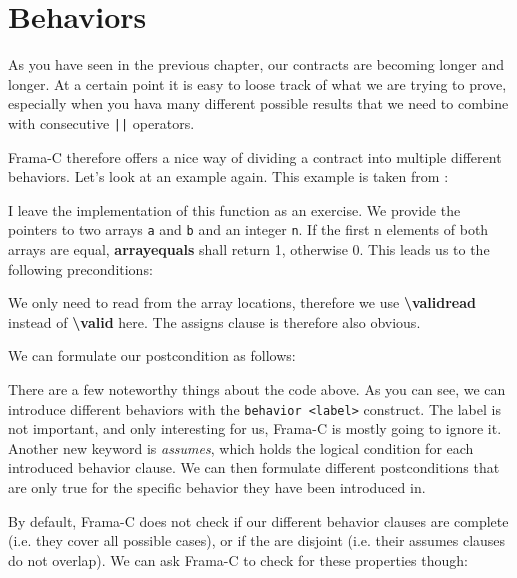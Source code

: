 \chapter{Behaviors}

As you have seen in the previous chapter, our contracts are becoming longer and longer. At a certain point it is easy to loose track of what we are trying to prove, especially when you hava many different possible results that we need to combine with consecutive \texttt{||} operators. 

Frama-C therefore offers a nice way of dividing a contract into multiple different behaviors. Let's look at an example again. This example is taken from \cite{gerlach_acsl_2020}: 


I leave the implementation of this function as an exercise. We provide the pointers to two arrays \texttt{a} and \texttt{b} and an integer \texttt{n}. If the first n elements of both arrays are equal, \textbf{array\textunderscore equals} shall return 1, otherwise 0. This leads us to the following preconditions:


We only need to read from the array locations, therefore we use \textbf{\textbackslash valid\textunderscore read} instead of \textbf{\textbackslash valid} here. The assigns clause is therefore also obvious. 

We can formulate our postcondition as follows:


There are a few noteworthy things about the code above. As you can see, we can introduce different behaviors with the \texttt{behavior <label>} construct. The label is not important, and only interesting for us, Frama-C is mostly going to ignore it. Another new keyword is \emph{assumes}, which holds the logical condition for each introduced behavior clause. We can then formulate different postconditions that are only true for the specific behavior they have been introduced in. 

By default, Frama-C does not check if our different behavior clauses are complete (i.e. they cover all possible cases), or if the are disjoint (i.e. their assumes clauses do not overlap). We can ask Frama-C to check for these properties though: 


